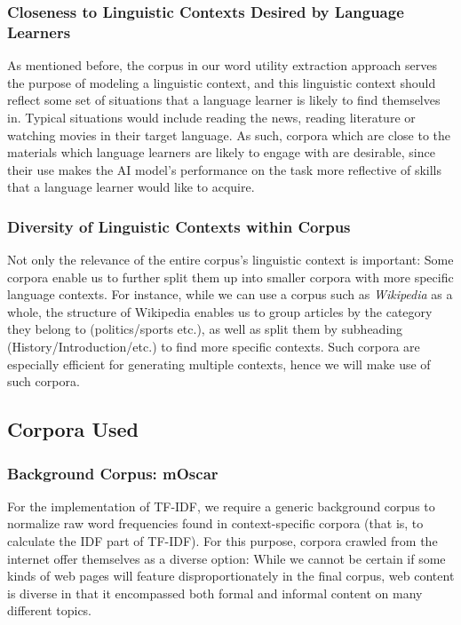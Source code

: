 \subsubsection{Closeness to Linguistic Contexts Desired by Language Learners}
As mentioned before, the corpus in our word utility extraction approach serves the purpose of modeling a linguistic context, and this linguistic context should reflect some set of situations that a language learner is likely to find themselves in.
Typical situations would include reading the news, reading literature or watching movies in their target language.
As such, corpora which are close to the materials which language learners are likely to engage with are desirable, since their use makes the AI model's performance on the task more reflective of skills that a language learner would like to acquire.

\subsubsection{Diversity of Linguistic Contexts within Corpus}
Not only the relevance of the entire corpus's linguistic context is important:
Some corpora enable us to further split them up into smaller corpora with more specific language contexts.
For instance, while we can use a corpus such as \textit{Wikipedia} as a whole, the structure of Wikipedia enables us to group articles by the category they belong to (politics/sports etc.), as well as split them by subheading (History/Introduction/etc.) to find more specific contexts.
Such corpora are especially efficient for generating multiple contexts, hence we will make use of such corpora.



\subsection{Corpora Used}

\subsubsection{Background Corpus: mOscar}
For the implementation of TF-IDF, we require a generic background corpus to normalize raw word frequencies found in context-specific corpora (that is, to calculate the IDF part of TF-IDF).
For this purpose, corpora crawled from the internet offer themselves as a diverse option:
While we cannot be certain if some kinds of web pages will feature disproportionately in the final corpus, web content is diverse in that it encompassed both formal and informal content on many different topics.


